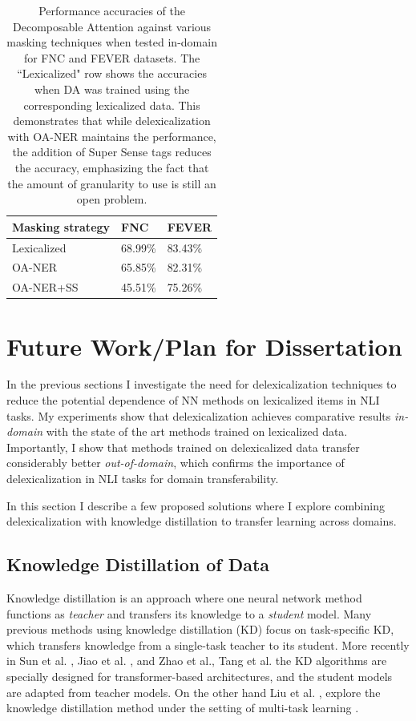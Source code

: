 \documentclass[compsoc,onecolumn]{IEEEtran}
\begin{document}
\begin{table}[h!]
\begin{center}
\begin{tabular}{|p{20mm}|p{9mm}|p{10mm}|}
 \hline
\textbf{Masking strategy} & \textbf{FNC}  & \textbf{FEVER}  \\ 
\hline
Lexicalized &68.99\% &83.43\% \\
OA-NER &65.85\% &82.31\%\\
OA-NER+SS & 45.51\% &75.26\%\\
\hline
\end{tabular}
\end{center}
    \caption{Performance accuracies of the Decomposable Attention against various masking techniques when tested in-domain for FNC and FEVER datasets. The ``Lexicalized" row shows the accuracies when DA was trained using the corresponding lexicalized data. This demonstrates that while delexicalization with OA-NER maintains the performance, the addition of Super Sense tags reduces the accuracy, emphasizing the fact that the amount of granularity to use is still an open problem.}
    \label{sstag}
\end{table}


\section{Future Work/Plan for Dissertation}
In the previous sections I investigate the need for delexicalization techniques to reduce the potential dependence of NN methods on lexicalized items in NLI tasks. My experiments show that delexicalization achieves comparative results {\em in-domain} with the state of the art methods trained on lexicalized data. Importantly, I show that methods trained on delexicalized data transfer considerably better {\em out-of-domain}, which  confirms the importance of delexicalization in NLI tasks for domain transferability.

In this section I describe a few proposed solutions where I explore combining delexicalization with knowledge distillation to transfer learning across domains.





\subsection{Knowledge Distillation of Data}
Knowledge distillation \citep*{ba2014deep,hinton2015distilling} is an approach where one neural network method functions as \textit{teacher} and transfers its knowledge to a \textit{student} model. Many previous methods using knowledge distillation (KD) focus on task-specific KD, which transfers knowledge from a single-task teacher to its student. More recently in Sun et al. \citep*{seo2016bidirectional} , Jiao et al. \citep*{jiao2019tinybert}, and Zhao et al.\citep*{zhao2019extreme}, Tang et al. \citep*{tang2019distilling} the KD algorithms are specially designed
for transformer-based architectures, and the student models are adapted from teacher models. On the other hand Liu et al. \citep*{liu2019attentive}, explore the knowledge distillation method under the setting of multi-task learning \citep*{caruana1997multitask} \citep*{baxter2000model}.
\end{document}
